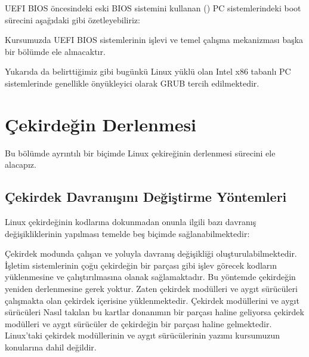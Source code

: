 \documentclass[a4paper,10pt,turkish]{sphinxmanual}
\begin{document}
\sphinxAtStartPar
UEFI BIOS öncesindeki eski BIOS sistemini kullanan () PC sistemlerindeki boot sürecini aşağıdaki
gibi özetleyebiliriz:


\sphinxAtStartPar
Kursumuzda UEFI BIOS sistemlerinin işlevi ve temel çalışma mekanizması başka bir bölümde ele alınacaktır.

\sphinxAtStartPar
Yukarıda da belirttiğimiz gibi bugünkü Linux yüklü olan Intel x86 tabanlı PC sistemlerinde genellikle önyükleyici
olarak GRUB tercih edilmektedir.

\sphinxstepscope


\chapter{Çekirdeğin Derlenmesi}
\label{\detokenize{kernelcompilation:cekirdegin-derlenmesi}}\label{\detokenize{kernelcompilation::doc}}
\sphinxAtStartPar
Bu bölümde ayrıntılı bir biçimde Linux çekireğinin derlenmesi sürecini ele alacapız.


\section{Çekirdek Davranışını Değiştirme Yöntemleri}
\label{\detokenize{kernelcompilation:cekirdek-davranisini-degistirme-yontemleri}}
\sphinxAtStartPar
Linux çekirdeğinin kodlarına dokunmadan onunla ilgili bazı davranış değişikliklerinin yapılması
temelde beş biçimde sağlanabilmektedir:

\sphinxAtStartPar
{}

\sphinxAtStartPar
Çekirdek modunda çalışan  ve 
yoluyla davranış değişikliği oluşturulabilmektedir. İşletim sistemlerinin çoğu çekirdeğin bir parçası
gibi işlev görecek kodların yüklenmesine ve çalıştırılmasına olanak sağlamaktadır. Bu yöntemde
çekirdeğin yeniden derlenmesine gerek yoktur. Zaten çekirdek modülleri ve aygıt sürücüleri çalışmakta
olan çekirdek içerisine yüklenmektedir. Çekirdek modüllerini ve aygıt sürücüleri  Nasıl takılan bu kartlar donanımın bir parçası
haline geliyorsa çekirdek modülleri ve aygıt sürücüler de çekirdeğin bir parçası haline gelmektedir.
Linux’taki çekirdek modüllerinin ve aygıt sürücülerinin yazımı kursumuzun konularına dahil değildir.
\end{document}

